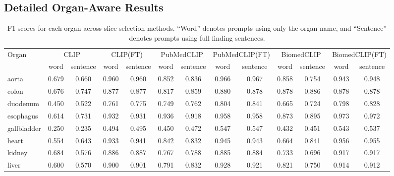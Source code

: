 \documentclass[bioengineering,article,submit,pdftex,moreauthors]{Definitions/mdpi}
\begin{document}
\clearpage
\begin{landscape}


\section{Detailed Organ-Aware Results}\label{app:organ_aware_details}


\begin{table}[ht]
  \centering
  \caption{F1 scores for each organ across slice selection methods. 
  “Word” denotes prompts using only the organ name, 
  and “Sentence” denotes prompts using full finding sentences.}
  \label{tab:organ_f1_comparison}
  \footnotesize
  \begin{tabular}{l*{6}{cc}}
    \toprule
    Organ
      & \multicolumn{2}{c}{CLIP}
      & \multicolumn{2}{c}{CLIP(FT)}
      & \multicolumn{2}{c}{PubMedCLIP}
      & \multicolumn{2}{c}{PubMedCLIP(FT)}
      & \multicolumn{2}{c}{BiomedCLIP}
      & \multicolumn{2}{c}{BiomedCLIP(FT)}  \\
    \cmidrule(lr){2-3}\cmidrule(lr){4-5}\cmidrule(lr){6-7}%
    \cmidrule(lr){8-9}\cmidrule(lr){10-11}\cmidrule(lr){12-13}
      & word & sentence
      & word & sentence
      & word & sentence
      & word & sentence
      & word & sentence
      & word & sentence  \\
    \midrule
    aorta             & 0.679 & 0.660 & 0.960 & 0.960 & 0.852 & 0.836 & 0.966 & 0.967 & 0.858 & 0.754 & 0.943 & 0.948  \\
    colon             & 0.676 & 0.747 & 0.877 & 0.877 & 0.817 & 0.859 & 0.880 & 0.878 & 0.878 & 0.886 & 0.878 & 0.878  \\
    duodenum          & 0.450 & 0.522 & 0.761 & 0.775 & 0.749 & 0.762 & 0.804 & 0.841 & 0.665 & 0.724 & 0.798 & 0.828  \\
    esophagus         & 0.614 & 0.731 & 0.932 & 0.931 & 0.936 & 0.918 & 0.958 & 0.958 & 0.873 & 0.895 & 0.973 & 0.972  \\
    gallbladder       & 0.250 & 0.235 & 0.494 & 0.495 & 0.450 & 0.472 & 0.547 & 0.547 & 0.432 & 0.451 & 0.543 & 0.537  \\
    heart             & 0.554 & 0.643 & 0.933 & 0.941 & 0.842 & 0.832 & 0.945 & 0.943 & 0.664 & 0.841 & 0.956 & 0.955  \\
    kidney            & 0.684 & 0.576 & 0.886 & 0.887 & 0.767 & 0.788 & 0.885 & 0.884 & 0.733 & 0.696 & 0.917 & 0.917  \\
    liver             & 0.600 & 0.570 & 0.900 & 0.901 & 0.791 & 0.832 & 0.928 & 0.921 & 0.821 & 0.750 & 0.914 & 0.912  \\

\end{tabular}
\end{table}
\end{landscape}
\end{document}
